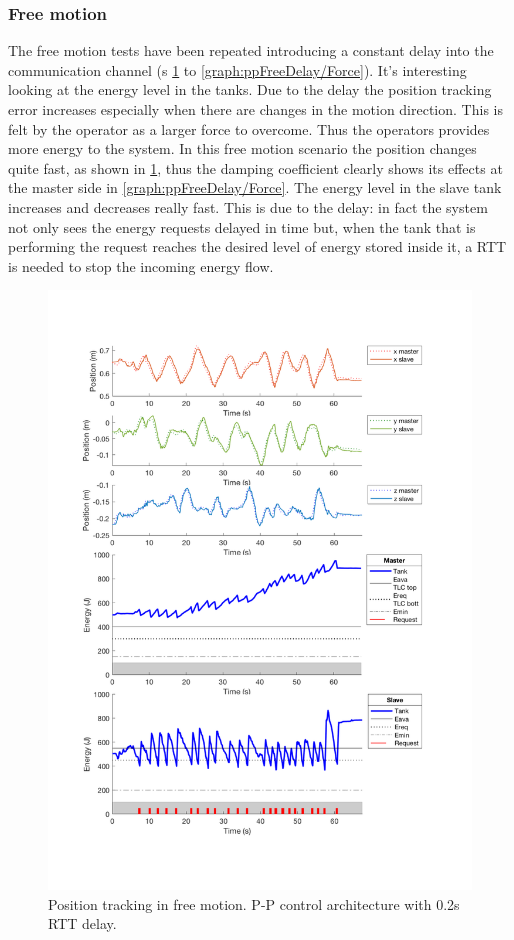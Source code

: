 \subsubsection{Free motion}
The free motion tests have been repeated introducing a constant delay into the communication channel (\figurename s{ \ref{graph:ppFreeDelay/Position} to \ref{graph:ppFreeDelay/Force}}).
It's interesting looking at the energy level in the tanks. Due to the delay the position tracking error increases especially when there are changes in the motion direction. This is felt by the operator as a larger force to overcome. Thus the operators provides more energy to the system. In this free motion scenario the position changes quite fast, as shown in \figurename{ \ref{graph:ppFreeDelay/Position}}, thus the damping coefficient clearly shows its effects at the master side in \figurename{ \ref{graph:ppFreeDelay/Force}}.
The energy level in the slave tank increases and decreases really fast. This is due to the delay: in fact the system not only sees the energy requests delayed in time but, when the tank that is performing the request reaches the desired level of energy stored inside it, a RTT is needed to stop the incoming energy flow.
\begin{center} 
	\begin{figure}
		\includegraphics[width=\textwidth, keepaspectratio]{plots/ppDelay/Position.pdf}
		\caption{Position tracking in free motion. P-P control architecture with 0.2s RTT delay.}
		\label{graph:ppFreeDelay/Position}
	\end{figure}
\end{center}
